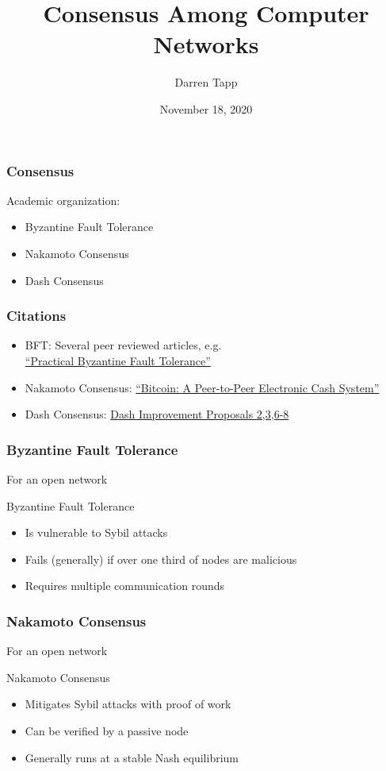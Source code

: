 \documentclass[english,handout]{beamer}
\title[Consensus]{Consensus Among Computer Networks}
\author{Darren Tapp}
\institute[ASU]
{
  Arizona State University
}
\date{November 18, 2020}
\begin{document}
\begin{frame}
  \titlepage
\end{frame}


\begin{frame}
\frametitle{Consensus}

Academic organization:
\begin{itemize}
\item<2->
Byzantine Fault Tolerance
\item<3->
Nakamoto Consensus
\item<4->
Dash Consensus

\end{itemize}

\end{frame}

\begin{frame}
\frametitle{Citations}

\begin{itemize}
\item<1-> BFT: Several peer reviewed articles, e.g. \\
\href{https://blog.tappmath.com/files/Practical_Byzantine_Fault_Tolerance.pdf}{``Practical Byzantine Fault Tolerance''}
\item<2-> Nakamoto Consensus: \href{https://blog.tappmath.com/files/bitcoin.pdf}{``Bitcoin: A Peer-to-Peer Electronic Cash System''}
\item<3-> Dash Consensus: \href{https://github.com/dashpay/dips}{Dash Improvement Proposals 2,3,6-8}
\end{itemize}

\end{frame}

\begin{frame}
\frametitle{Byzantine Fault Tolerance}

For an open network
\begin{block}{Byzantine Fault Tolerance }
\begin{itemize}
\item Is vulnerable to Sybil attacks
\item Fails (generally) if over one third of nodes are malicious
\item Requires multiple communication rounds
\end{itemize}
\end{block}
\end{frame}

\begin{frame}
\frametitle{Nakamoto Consensus}

For an open network
\begin{block}{Nakamoto Consensus }
\begin{itemize}
\item Mitigates Sybil attacks with proof of work
\item Can be verified by a passive node
\item Generally runs at a stable Nash equilibrium
\end{itemize}
\end{block}

\end{frame}
\end{document}
